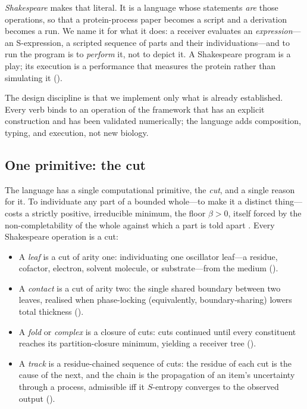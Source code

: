 \documentclass[11pt,a4paper]{article}
\theoremstyle{thmstyle}
\theoremstyle{definition}
\theoremstyle{remark}
\newcommand{\flo}{\beta}
\begin{document}
\emph{Shakespeare} makes that literal. It is a language whose statements
\emph{are} those operations, so that a protein-process paper becomes a
script and a derivation becomes a run. We name it for what it does: a
receiver evaluates an \emph{expression}---an S-expression, a scripted
sequence of parts and their individuations---and to run the program is to
\emph{perform} it, not to depict it. A Shakespeare program is a play; its
execution is a performance that measures the protein rather than
simulating it ().

The design discipline is that we implement only what is already
established. Every verb binds to an operation of the framework that has an
explicit construction and has been validated numerically; the language
adds composition, typing, and execution, not new biology.

\subsection{One primitive: the cut}

The language has a single computational primitive, the \emph{cut}, and a
single reason for it. To individuate any part of a bounded whole---to make
it a distinct thing---costs a strictly positive, irreducible minimum, the
floor $\flo>0$, itself forced by the non-completability of the whole
against which a part is told apart \citep{sachikonye2025graphs,%
sachikonye2025causal}. Every Shakespeare operation is a cut:

\begin{itemize}[leftmargin=1.4em,itemsep=2pt]
\item A \emph{leaf} is a cut of arity one: individuating one oscillator
leaf---a residue, cofactor, electron, solvent molecule, or
substrate---from the medium ().
\item A \emph{contact} is a cut of arity two: the single shared boundary
between two leaves, realised when phase-locking (equivalently,
boundary-sharing) lowers total thickness ().
\item A \emph{fold} or \emph{complex} is a closure of cuts: cuts continued
until every constituent reaches its partition-closure minimum, yielding a
receiver tree ().
\item A \emph{track} is a residue-chained sequence of cuts: the residue of
each cut is the cause of the next, and the chain is the propagation of an
item's uncertainty through a process, admissible iff it $S$-entropy
converges to the observed output ().
\end{itemize}
\end{document}
